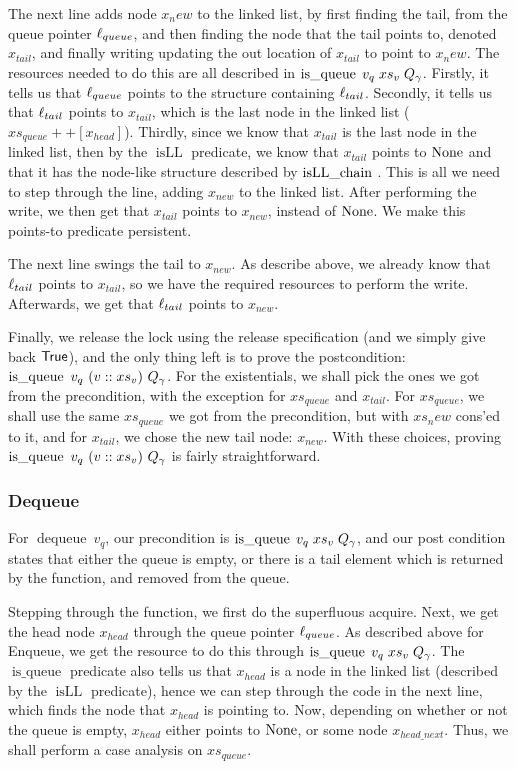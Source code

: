 \documentclass[twoside,11pt,openright]{report}
\newcommand{\dequeue}{\operatorname{dequeue}}
\newcommand{\isqueue}{\operatorname{is\_queue}}
\newcommand{\isLLchain}[1]{\operatorname{isLL\_chain} \; #1}
\newcommand{\isLL}{\operatorname{isLL}}
\begin{document}
The next line adds node $x_new$ to the linked list, by first finding the tail, from the queue pointer $\ell_{queue}$, and then finding the node that the tail points to, denoted $x_{tail}$, and finally writing updating the out location of $x_{tail}$ to point to $x_new$. The resources needed to do this are all described in $\isqueue \; v_q \; xs_v \; Q_\gname$. Firstly, it tells us that $\ell_{queue}$ points to the structure containing $\ell_{tail}$. Secondly, it tells us that $\ell_{tail}$ points to $x_{tail}$, which is the last node in the linked list ($xs_{queue} ++ [x_{head}]$). Thirdly, since we know that $x_{tail}$ is the last node in the linked list, then by the $\isLL$ predicate, we know that $x_{tail}$ points to $\operatorname{None}$ and that it has the node-like structure described by $\isLLchain$. This is all we need to step through the line, adding $x_{new}$ to the linked list. After performing the write, we then get that $x_{tail}$ points to $x_{new}$, instead of $\operatorname{None}$. We make this points-to predicate persistent.

The next line swings the tail to $x_{new}$. As describe above, we already know that $\ell_{tail}$ points to $x_{tail}$, so we have the required resources to perform the write. Afterwards, we get that $\ell_{tail}$ points to $x_{new}$.

Finally, we release the lock using the release specification (and we simply give back $\textsf{True}$), and the only thing left is to prove the postcondition: $\isqueue\ v_q\ (v :: xs_v)\ Q_\gname$. For the existentials, we shall pick the ones we got from the precondition, with the exception for $xs_{queue}$ and $x_{tail}$. For $xs_{queue}$, we shall use the same $xs_{queue}$ we got from the precondition, but with $xs_new$ cons'ed to it, and for $x_{tail}$, we chose the new tail node: $x_{new}$. With these choices, proving $\isqueue\ v_q\ (v :: xs_v)\ Q_\gname$ is fairly straightforward.

\subsubsection{Dequeue}

For $\dequeue\ v_q$, our precondition is $\isqueue \; v_q \; xs_v \; Q_\gname$, and our post condition states that either the queue is empty, or there is a tail element which is returned by the function, and removed from the queue.

Stepping through the function, we first do the superfluous acquire. Next, we get the head node $x_{head}$ through the queue pointer $\ell_{queue}$. As described above for Enqueue, we get the resource to do this through $\isqueue \; v_q \; xs_v \; Q_\gname$. The $\isqueue$ predicate also tells us that $x_{head}$ is a node in the linked list (described by the $\isLL$ predicate), hence we can step through the code in the next line, which finds the node that $x_{head}$ is pointing to. Now, depending on whether or not the queue is empty, $x_{head}$ either points to $\operatorname{None}$, or some node $x_{head\_next}$. Thus, we shall perform a case analysis on $xs_{queue}$.
\end{document}
